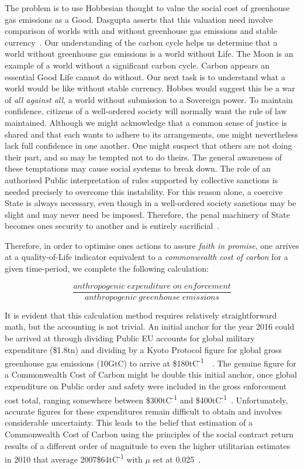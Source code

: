 \documentclass[11pt, oneside]{book}   	%
\begin{document}
The problem is to use Hobbesian thought to value the social cost of greenhouse gas emissions as a Good.
Dasgupta asserts that this valuation need involve comparison of worlds with and without greenhouse gas emissions and stable currency~\cite{pd2}.
Our understanding of the carbon cycle helps us determine that a world without greenhouse gas emissions is a world without Life.
The Moon is an example of a world without a significant carbon cycle.
Carbon appears an essential Good Life cannot do without.
Our next task is to understand what a world would be like without stable currency.
Hobbes would suggest this be a war of \emph{all against all}, a world without submission to a Sovereign power.
To maintain confidence, citizens of a well-ordered society will normally want the rule of law maintained.
Although we might acknowledge that a common sense of justice is shared and that each wants to adhere to its arrangements, one might nevertheless lack full confidence in one another.
One might suspect that others are not doing their part, and so may be tempted not to do theirs.
The general awareness of these temptations may cause social systems to break down.
The role of an authorised Public interpretation of rules supported by collective sanctions is needed precisely to overcome this instability.
For this reason alone, a coercive State is always necessary, even though in a well-ordered society sanctions may be slight and may never need be imposed.
Therefore, the penal machinery of State becomes ones security to another and is entirely sacrificial~\cite{jr1}.\par

Therefore, in order to optimise ones actions to assure \emph{faith in promise}, one arrives at a quality-of-Life indicator equivalent to a \emph{commonwealth cost of carbon} for a given time-period, we complete the following calculation:

\begin{equation}
	\frac{anthropogenic\; expenditure\; on\; enforcement}{anthropogenic\; greenhouse\; emissions}
\end{equation}

It is evident that this calculation method requires relatively straightforward math, but the accounting is not trivial.
An initial anchor for the year 2016 could be arrived at through dividing Public EU accounts for global military expenditure (\$1.8tn) and dividing by a Kyoto Protocol figure for global gross greenhouse gas emissions (10GtC) to arrive at \$180tC\textsuperscript{-1}~\cite{eu1}~\cite{co1}.
The genuine figure for a Commonwealth Cost of Carbon might be double this initial anchor, once global expenditure on Public order and safety were included in the gross enforcement cost total, ranging somewhere between \$300tC\textsuperscript{-1} and \$400tC\textsuperscript{-1}~\cite{oecd1}.
Unfortunately, accurate figures for these expenditures remain difficult to obtain and involves considerable uncertainty.
This leads to the belief that estimation of a Commonwealth Cost of Carbon using the principles of the social contract return results of a different order of magnitude to even the higher utilitarian estimates in 2010 that average 2007\$64tC\textsuperscript{-1}  with $\mu$ set at 0.025~\cite{iwg1}.
\end{document}
